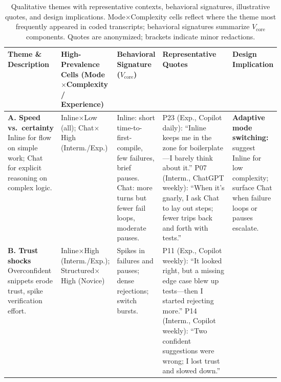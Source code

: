 \documentclass[sigconf]{acmart}
\begin{document}
\begin{table}[h]
  \centering
  \caption{Qualitative themes with representative contexts, behavioral signatures, illustrative quotes, and design implications. Mode$\times$Complexity cells reflect where the theme most frequently appeared in coded transcripts; behavioral signatures summarize $V_{\text{core}}$ components. Quotes are anonymized; brackets indicate minor redactions.}
  \label{tab:themes-quotes}
  \small
  \begin{tabularx}{\linewidth}{
    >{\raggedright\arraybackslash}p{0.17\linewidth} 
    >{\raggedright\arraybackslash}p{0.15\linewidth} 
    >{\raggedright\arraybackslash}p{0.15\linewidth} 
    >{\raggedright\arraybackslash}X 
    >{\raggedright\arraybackslash}p{0.15\linewidth}
  }
    \toprule
    \textbf{Theme \& Description} & \textbf{High-Prevalence Cells (Mode$\times$Complexity / Experience)} & \textbf{Behavioral Signature ($V_{\text{core}}$)} & \textbf{Representative Quotes} & \textbf{Design Implication} \\
    \midrule
    \textbf{A. Speed vs.\ certainty} \newline
    Inline for flow on simple work; Chat for explicit reasoning on complex logic.
    &
    Inline$\times$Low (all); Chat$\times$High (Interm./Exp.)
    &
    Inline: short time-to-first-compile, few failures, brief pauses. \newline
    Chat: more turns but fewer fail loops, moderate pauses.
    &
    P23 (Exp., Copilot daily): ``Inline keeps me in the zone for boilerplate---I barely think about it.'' \newline \newline
    P07 (Interm., ChatGPT weekly): ``When it's gnarly, I ask Chat to lay out steps; fewer trips back and forth with tests.''
    &
    \textbf{Adaptive mode switching:} suggest Inline for low complexity; surface Chat when failure loops or pauses escalate.
    \\
    \midrule
    \textbf{B. Trust shocks} \newline
    Overconfident snippets erode trust, spike verification effort.
    &
    Inline$\times$High (Interm./Exp.); Structured$\times$High (Novice)
    &
    Spikes in failures and pauses; dense rejections; switch bursts.
    &
    P11 (Exp., Copilot weekly): ``It looked right, but a missing edge case blew up tests---then I started rejecting more.'' \newline \newline
    P14 (Interm., Copilot weekly): ``Two confident suggestions were wrong; I lost trust and slowed down.''

\end{tabularx}
\end{table}
\end{document}
